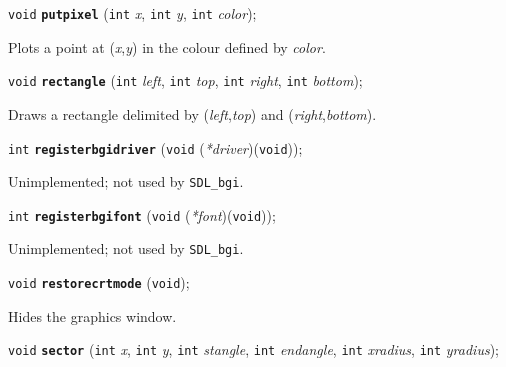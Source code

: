 \documentclass[a4paper,12pt]{article}
\newcommand{\SDLbgi}{\texttt{SDL\_bgi}}
\newcommand{\V}{\texttt{void}}      %
\newcommand{\I}{\texttt{int}}       %
\newcommand{\func}[1]{\textbf{\texttt{#1}}}  %
\newcommand{\A}[1]{\emph{#1}}       %
\newenvironment{bgi}
{ %
  \begin{snugshade}
}
{ %
  \end{snugshade}
}
\begin{document}

\label{sec:putpixel}

\begin{bgi}
\V{} \func{putpixel} (\I{} \A{x}, \I{} \A{y}, \I{} \A{color});
\end{bgi}

Plots a point at (\A{x},\A{y}) in the colour defined by \A{color}.


\label{sec:rectangle}

\begin{bgi}
\V{} \func{rectangle} (\I{} \A{left}, \I{} \A{top}, \I{} \A{right},
\I{} \A{bottom});
\end{bgi}

Draws a rectangle delimited by (\A{left},\A{top}) and
(\A{right},\A{bottom}).


\label{sec:registerbgidriver}

\begin{bgi}
\I{} \func{registerbgidriver} (\V{} (\A{*driver})(\V{}));
\end{bgi}

Unimplemented; not used by \SDLbgi.


\label{sec:registerbgifont}

\begin{bgi}
\I{} \func{registerbgifont} (\V{} (\A{*font})(\V{}));
\end{bgi}

Unimplemented; not used by \SDLbgi.


\label{sec:restorecrtmode}

\begin{bgi}
\V{} \func{restorecrtmode} (\V{});
\end{bgi}

Hides the graphics window.


\label{sec:sector}

\begin{bgi}
\V{} \func{sector} (\I{} \A{x}, \I{} \A{y}, \I{} \A{stangle}, \I{}
\A{endangle}, \I{} \A{xradius}, \I{} \A{yradius});
\end{bgi}
\end{document}
